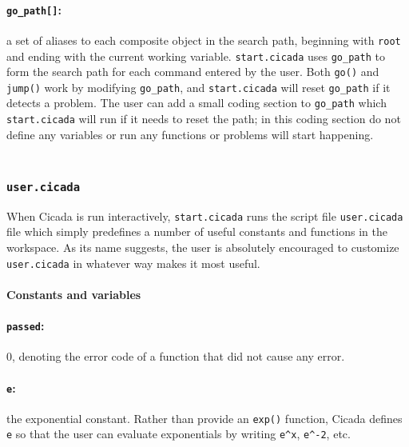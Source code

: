 \documentclass{article}
\begin{document}
\paragraph{\texttt{go\_path[]}:}  a set of aliases to each composite object in the search path, beginning with \verb#root# and ending with the current working variable.  \verb#start.cicada# uses \verb#go_path# to form the search path for each command entered by the user.  Both \verb#go()# and \verb#jump()# work by modifying \verb#go_path#, and \verb#start.cicada# will reset \verb#go_path# if it detects a problem.  The user can add a small coding section to \verb#go_path# which \verb#start.cicada# will run if it needs to reset the path; in this coding section do not define any variables or run any functions or problems will start happening.\\\\






\subsubsection{\texttt{user.cicada}} 

When Cicada is run interactively, \verb#start.cicada# runs the script file \verb#user.cicada# file which simply predefines a number of useful constants and functions in the workspace.  As its name suggests, the user is absolutely encouraged to customize \verb#user.cicada# in whatever way makes it most useful.




\paragraph{Constants and variables}


\paragraph{\texttt{passed}:}  0, denoting the error code of a function that did not cause any error.

\paragraph{\texttt{e}:}  the exponential constant.  Rather than provide an \texttt{exp()} function, Cicada defines \texttt{e} so that the user can evaluate exponentials by writing \verb#e^x#,  \verb#e^-2#, etc.
\end{document}
